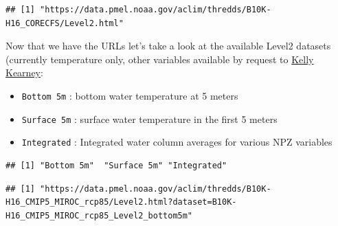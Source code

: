 \documentclass[
]{article}
\newenvironment{Shaded}{\begin{snugshade}}{\end{snugshade}}
\newcommand{\CommentTok}[1]{\textcolor[rgb]{0.56,0.35,0.01}{\textit{#1}}}
\newcommand{\KeywordTok}[1]{\textcolor[rgb]{0.13,0.29,0.53}{\textbf{#1}}}
\newcommand{\NormalTok}[1]{#1}
\newcommand{\OperatorTok}[1]{\textcolor[rgb]{0.81,0.36,0.00}{\textbf{#1}}}
\newcommand{\StringTok}[1]{\textcolor[rgb]{0.31,0.60,0.02}{#1}}
\providecommand{\tightlist}{%
  \setlength{\itemsep}{0pt}\setlength{\parskip}{0pt}}
\begin{document}
\begin{verbatim}
## [1] "https://data.pmel.noaa.gov/aclim/thredds/B10K-H16_CORECFS/Level2.html"
\end{verbatim}

Now that we have the URLs let's take a look at the available Level2
datasets (currently temperature only, other variables available by
request to \href{kelly.kearney@noaa.gov}{Kelly Kearney}:

\begin{itemize}
\tightlist
\item
  \texttt{Bottom\ 5m} : bottom water temperature at 5 meters
\item
  \texttt{Surface\ 5m} : surface water temperature in the first 5 meters
\item
  \texttt{Integrated} : Integrated water column averages for various NPZ
  variables
\end{itemize}

\begin{Shaded}
\end{Shaded}

\begin{verbatim}
## [1] "Bottom 5m"  "Surface 5m" "Integrated"
\end{verbatim}

\begin{Shaded}
\end{Shaded}

\begin{verbatim}
## [1] "https://data.pmel.noaa.gov/aclim/thredds/B10K-H16_CMIP5_MIROC_rcp85/Level2.html?dataset=B10K-H16_CMIP5_MIROC_rcp85_Level2_bottom5m"
\end{verbatim}
\end{document}
